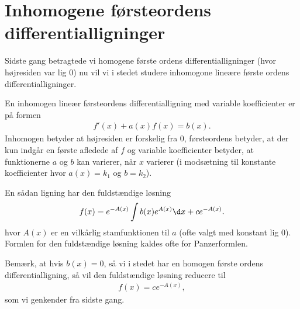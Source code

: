 \section{Inhomogene førsteordens differentialligninger}
\noindent Sidste gang betragtede vi homogene første ordens differentialligninger (hvor højresiden var lig $0$) nu vil vi i stedet studere inhomogone lineære første ordens differentialligninger.

En inhomogen lineær førsteordens differentialligning med variable koefficienter er på formen 
\begin{align*}
f'(x) + a(x)f(x)=b(x).
\end{align*}
Inhomogen betyder at højresiden er forskelig fra $0$, førsteordens betyder, at der kun indgår en første afledede af $f$ og variable koefficienter betyder, at funktionerne $a$ og $b$ kan varierer, når $x$ varierer (i modsætning til konstante koefficienter hvor $a(x)=k_1$ og $b=k_2$).

En sådan ligning har den fuldstændige løsning 
\begin{align}\label{eq:diffeq4et}
f(x)=e^{-A(x)} \int b(x) e^{A(x)} \d x + ce^{-A(x)}.
\end{align}
hvor $A(x)$ er en vilkårlig stamfunktionen til $a$ (ofte valgt med konstant lig $0$). Formlen for den fuldstændige løsning kaldes ofte for Panzerformlen.

Bemærk, at hvis $b(x)=0$, så vi i stedet har en homogen første ordens differentialligning, så vil den fuldstændige løsning reducere til 
\begin{align*}
f(x)=ce^{-A(x)},
\end{align*}
som vi genkender fra sidste gang.

